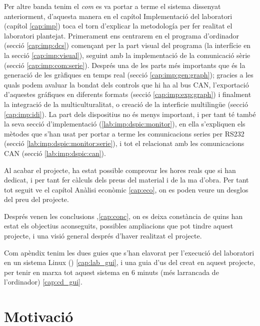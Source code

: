 Per altre banda tenim el \emph{com} es va portar a terme el sistema dissenyat anteriorment, d'aquesta manera en el capítol Implementació del laboratori (capítol \ref{cap:imp}) toca el torn d'explicar la metodología per fer realitat el laboratori plantejat. 
Primerament ens centrarem en el programa d'ordinador \DCSMonitor (secció \ref{cap:imp:dcs}) començant per la part visual del programa (la interfície en la secció \ref{cap:imp:visual}), seguint amb la implementació de la comunicació sèrie (secció \ref{cap:imp:com:serie}). Després una de les parts més importants que és la generació de les gràfiques en temps real (secció \ref{cap:imp:gen:graph}); gracies a les quals podem avaluar la bondat dels controls que hi ha al bus CAN, l'exportació d'aquestes gráfiques en diferents formats (secció \ref{cap:imp:exp:graph}) i finalment la integració de la multiculturalitat, o creació de la interficie multilingüe (secció \ref{cap:imp:idi}).
La part dels dispositius no és menys important, i per tant té també la seva secció d'implementació (\ref{lab:imp:dspic:monitor}), en ella s'expliquen els mètodes que s'han usat per portar a terme les comunicacions series per RS232 (secció \ref{lab:imp:dspic:monitor:serie}), i tot el relacionat amb les comunicacions CAN (secció \ref{lab:imp:dspic:can}).


Al acabar el projecte, ha estat possible comprovar les hores reals que si han dedicat, i per tant fer càlculs dels preus del material i de la ma d'obra. Per tant tot seguit ve el capítol Anàlisi econòmic \ref{cap:eco}, on es poden veure un desglos del preu del projecte.

Després venen les conclusions ,\ref{cap:conc}, on es deixa constància de quins han estat els objectius aconseguits, possibles ampliacions que pot tindre aquest projecte, i una visió general després d'haver realitzat el projecte.


Com apèndix tenim les dues guies que s'han elavorat per l'execució del laboratori en un sistema Linux (\Ubuntu) \ref{cap:lab_gui}, i una guia d'us del \LiveCD creat en aquest projecte, per tenir en marxa tot aquest sistema en 6 minuts (més larrancada de l'ordinador) \ref{cap:cd_gui}.


\section{Motivació}\label{cap:int:mot}

